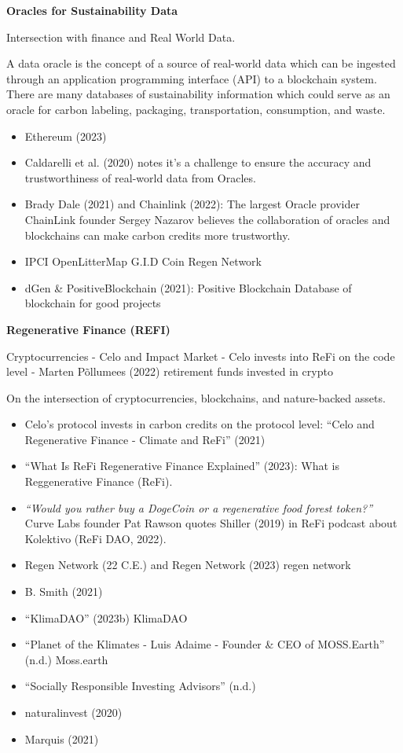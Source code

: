 \documentclass[
  letterpaper,
  DIV=11,
  numbers=noendperiod]{scrartcl}
\providecommand{\tightlist}{%
  \setlength{\itemsep}{0pt}\setlength{\parskip}{0pt}}\usepackage{longtable,booktabs,array}
\begin{document}
\textbf{Oracles for Sustainability Data}

Intersection with finance and Real World Data.

A data oracle is the concept of a source of real-world data which can be
ingested through an application programming interface (API) to a
blockchain system. There are many databases of sustainability
information which could serve as an oracle for carbon labeling,
packaging, transportation, consumption, and waste.

\begin{itemize}
\item
  Ethereum (2023)
\item
  Caldarelli et al. (2020) notes it's a challenge to ensure the accuracy
  and trustworthiness of real-world data from Oracles.
\item
  Brady Dale (2021) and Chainlink (2022): The largest Oracle provider
  ChainLink founder Sergey Nazarov believes the collaboration of oracles
  and blockchains can make carbon credits more trustworthy.
\item
  IPCI OpenLitterMap G.I.D Coin Regen Network
\item
  dGen \& PositiveBlockchain (2021): Positive Blockchain Database of
  blockchain for good projects
\end{itemize}

\textbf{Regenerative Finance (REFI)}

Cryptocurrencies - Celo and Impact Market - Celo invests into ReFi on
the code level - Marten Põllumees (2022) retirement funds invested in
crypto

On the intersection of cryptocurrencies, blockchains, and nature-backed
assets.

\begin{itemize}
\tightlist
\item
  Celo's protocol invests in carbon credits on the protocol level:
  {``Celo and {Regenerative Finance} - {Climate} and {ReFi}''} (2021)
\item
  {``What Is {ReFi} {\textbar} {Regenerative Finance} Explained''}
  (2023): What is Reggenerative Finance (ReFi).
\item
  \emph{``Would you rather buy a DogeCoin or a regenerative food forest
  token?''} Curve Labs founder Pat Rawson quotes Shiller (2019) in ReFi
  podcast about Kolektivo (ReFi DAO, 2022).
\item
  Regen Network (22 C.E.) and Regen Network (2023) regen network
\item
  B. Smith (2021)
\item
  {``{KlimaDAO}''} (2023b) KlimaDAO
\item
  {``Planet of the {Klimates} - {Luis Adaime} - {Founder} \& {CEO} of
  {MOSS}.{Earth}''} (n.d.) Moss.earth
\item
  {``Socially {Responsible Investing Advisors}''} (n.d.)
\item
  naturalinvest (2020)
\item
  Marquis (2021)
\end{itemize}
\end{document}
